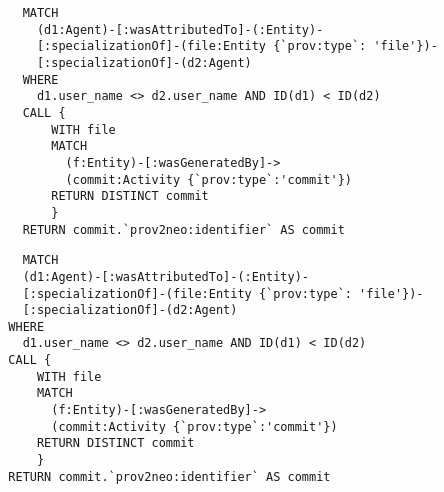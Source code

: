 \begin{verbatim}
    MATCH 
      (d1:Agent)-[:wasAttributedTo]-(:Entity)-
      [:specializationOf]-(file:Entity {`prov:type`: 'file'})-
      [:specializationOf]-(d2:Agent)
    WHERE 
      d1.user_name <> d2.user_name AND ID(d1) < ID(d2)
    CALL {
        WITH file
        MATCH 
          (f:Entity)-[:wasGeneratedBy]->
          (commit:Activity {`prov:type`:'commit'})
        RETURN DISTINCT commit
        }
    RETURN commit.`prov2neo:identifier` AS commit
\end{verbatim}

\begin{lstlisting}
    MATCH 
    (d1:Agent)-[:wasAttributedTo]-(:Entity)-
    [:specializationOf]-(file:Entity {`prov:type`: 'file'})-
    [:specializationOf]-(d2:Agent)
  WHERE 
    d1.user_name <> d2.user_name AND ID(d1) < ID(d2)
  CALL {
      WITH file
      MATCH 
        (f:Entity)-[:wasGeneratedBy]->
        (commit:Activity {`prov:type`:'commit'})
      RETURN DISTINCT commit
      }
  RETURN commit.`prov2neo:identifier` AS commit
\end{lstlisting}